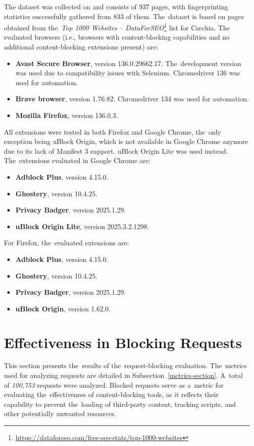 The dataset was collected on  and consists of 937 pages, with fingerprinting statistics successfully gathered from 833 of them. The~dataset is based on pages obtained from the~\textit{Top 1000 Websites -- DataForSEO}\footnote{\url{https://dataforseo.com/free-seo-stats/top-1000-websites}} list for Czechia.
The evaluated browsers (i.e., browsers with content-blocking capabilities and no additional content-blocking extensions present) are:

\begin{itemize}
\setlength\itemsep{0em}
\item \textbf{Avast Secure Browser}, version 136.0.29662.17. The~development version was used due to compatibility issues with Selenium. Chromedriver 136 was used for automation.
\item \textbf{Brave browser}, version 1.76.82. Chromedriver 134 was used for automation.
\item \textbf{Mozilla Firefox}, version 136.0.3.
\end{itemize}

All extensions were tested in both Firefox and Google Chrome, the~only exception being uBlock Origin, which is not available in Google Chrome anymore due to its lack of Manifest 3 support. uBlock Origin Lite was used instead. The~extensions evaluated in Google Chrome are:

\begin{itemize}
\setlength\itemsep{0em}
\item \textbf{Adblock Plus}, version 4.15.0.
\item \textbf{Ghostery}, version 10.4.25.
\item \textbf{Privacy Badger}, version 2025.1.29.
\item \textbf{uBlock Origin Lite}, version 2025.3.2.1298.
\end{itemize}

For Firefox, the~evaluated extensions are:

\begin{itemize}
\setlength\itemsep{0em}
\item \textbf{Adblock Plus}, version 4.15.0.
\item \textbf{Ghostery}, version 10.4.25.
\item \textbf{Privacy Badger}, version 2025.1.29.
\item \textbf{uBlock Origin}, version 1.62.0.
\end{itemize}

\section{Effectiveness in Blocking Requests}
\label{blocking-effectiveness}
This section presents the~results of the~request-blocking evaluation. The~metrics used for analyzing requests are detailed in Subsection~\ref{metrics-section}. A~total of \textit{100,753} requests were analyzed. Blocked requests serve as a~metric for evaluating the~effectiveness of content-blocking tools, as it reflects their capability to prevent the~loading of third-party content, tracking scripts, and other potentially unwanted resources. 

